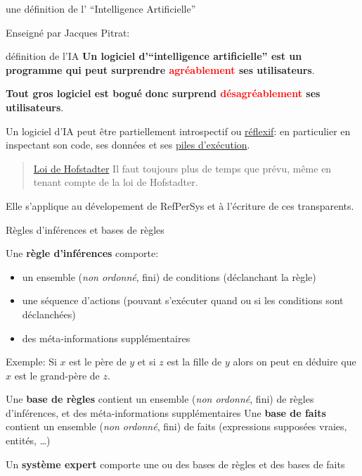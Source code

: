 \documentclass[final,a4,xcolor={svgnames,dvipsnames}]{beamer}
\begin{document}
 \begin{frame}{une définition de l' ``Intelligence Artificielle''}

   Enseigné par Jacques Pitrat:
   
   \begin{block}{définition de l'IA}
     \textbf{Un logiciel d'``intelligence artificielle'' est un programme qui peut surprendre \textcolor{red}{agréablement} ses utilisateurs}.
   \end{block}

   \bigskip
   
   \textbf{Tout gros logiciel est bogué} {} \textbf{donc surprend \textcolor{red}{désagréablement} ses utilisateurs}.

   \bigskip

   Un logiciel d'IA peut être partiellement introspectif ou
   \href{https://fr.wikipedia.org/wiki/Réflexion_(informatique)}{réflexif}:
   en particulier en inspectant son code, ses données et ses
   \href{https://fr.wikipedia.org/wiki/Pile_d'exécution}{piles
     d'exécution}.

   \bigskip
   
\begin{quote}{\href{https://fr.wikipedia.org/wiki/Loi_de_Hofstadter}{Loi de Hofstadter}} Il faut toujours plus de temps que prévu, même en tenant compte de la loi de Hofstadter.
\end{quote}

Elle s'applique au dévelopement de RefPerSys et à l'écriture de ces
transparents.
   
 \end{frame}

 \begin{frame}{Règles d'inférences  et bases de règles}

   Une \textbf{règle d'inférences} comporte:

   \begin{itemize}
   \item un ensemble (\textit{non ordonné}, fini) de conditions
     (déclanchant la règle)
   \item une séquence d'actions (pouvant s'exécuter quand ou si les
     conditions sont déclanchées)
   \item des méta-informations supplémentaires
   \end{itemize}

   Exemple: Si $x$ est le père de $y$ et si $z$ est la fille de $y$
   alors on peut en déduire que $x$ est le grand-père de $z$.

   \bigskip
   

   Une \textbf{base de règles} contient un ensemble (\textit{non
     ordonné}, fini) de règles d'inférences, et des méta-informations
   supplémentaires
 Une \textbf{base de faits} contient un ensemble
 (\textit{non ordonné}, fini) de faits (expressions supposées vraies, entités, \ldots)

 \bigskip
 
   Un \textbf{système expert} comporte une ou des bases de règles et
   des bases de faits
 \end{frame}
 
\end{document}
